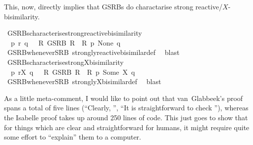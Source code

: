 \begin{isabellebody}
\endisatagproof
{\isafoldproof}%
%
\isadelimproof
%
\endisadelimproof
%
\begin{isamarkuptext}%
This, now, directly implies that GSRBs do charactarise strong reactive/$X$-bisimilarity.%
\end{isamarkuptext}\isamarkuptrue%
%
\isadelimvisible
%
\endisadelimvisible
%
\isatagvisible
{}\isamarkupfalse%
\ GSRBs{\isacharunderscore}{\kern0pt}characterise{\isacharunderscore}{\kern0pt}strong{\isacharunderscore}{\kern0pt}reactive{\isacharunderscore}{\kern0pt}bisimilarity{\isacharcolon}{\kern0pt}\isanewline
\ \ {\isacartoucheopen}p\ {\isasymleftrightarrow}\isactrlsub r\ q\ {\isasymLongleftrightarrow}\ {\isacharparenleft}{\kern0pt}{\isasymexists}\ R{\isachardot}{\kern0pt}\ GSRB\ R\ {\isasymand}\ R\ p\ None\ q{\isacharparenright}{\kern0pt}{\isacartoucheclose}\isanewline
\ \ \isamarkupfalse%
\ GSRB{\isacharunderscore}{\kern0pt}whenever{\isacharunderscore}{\kern0pt}SRB\ strongly{\isacharunderscore}{\kern0pt}reactive{\isacharunderscore}{\kern0pt}bisimilar{\isacharunderscore}{\kern0pt}def\ \isamarkupfalse%
\ blast\isanewline
\isanewline
{}\isamarkupfalse%
\ GSRBs{\isacharunderscore}{\kern0pt}characterise{\isacharunderscore}{\kern0pt}strong{\isacharunderscore}{\kern0pt}X{\isacharunderscore}{\kern0pt}bisimilarity{\isacharcolon}{\kern0pt}\isanewline
\ \ {\isacartoucheopen}p\ {\isasymleftrightarrow}\isactrlsub r\isactrlsup X\ q\ {\isasymLongleftrightarrow}\ {\isacharparenleft}{\kern0pt}{\isasymexists}\ R{\isachardot}{\kern0pt}\ GSRB\ R\ {\isasymand}\ R\ p\ {\isacharparenleft}{\kern0pt}Some\ X{\isacharparenright}{\kern0pt}\ q{\isacharparenright}{\kern0pt}{\isacartoucheclose}\isanewline
\ \ \isamarkupfalse%
\ GSRB{\isacharunderscore}{\kern0pt}whenever{\isacharunderscore}{\kern0pt}SRB\ strongly{\isacharunderscore}{\kern0pt}X{\isacharunderscore}{\kern0pt}bisimilar{\isacharunderscore}{\kern0pt}def\ \isamarkupfalse%
\ blast%
\endisatagvisible
{\isafoldvisible}%
%
\isadelimvisible
%
\endisadelimvisible
\isanewline
\isanewline
{}\isamarkupfalse%
\ %
%
\begin{isamarkuptext}%
As a little meta-comment, I would like to point out that van~Glabbeek's proof spans a total of five lines (\enquote{Clearly, \textelp{}}, \enquote{It is straightforward to check \textelp{}}), whereas the Isabelle proof takes up around 250 lines of code. This just goes to show that for things which are clear and straightforward for humans, it might require quite some effort to \enquote{explain} them to a computer.
\pagebreak%
\end{isamarkuptext}\isamarkuptrue%
%
\isadelimtheory
%
\endisadelimtheory
%
\isatagtheory
%
\endisatagtheory
{\isafoldtheory}%
%
\isadelimtheory
%
\endisadelimtheory
%
\end{isabellebody}%
